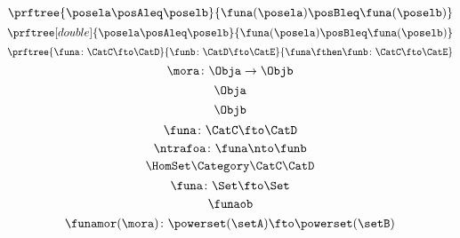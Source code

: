 {\begin{forslides}
        \begin{equation}
            \label{eq:mono2}
            \prftree{\posela \posAleq \poselb}{\funa(\posela) \posBleq \funa(\poselb)}
        \end{equation}
        \begin{equation}
            \label{eq:mono3}
            \prftree[double]{\posela \posAleq \poselb}{\funa(\posela) \posBleq \funa(\poselb)}
        \end{equation}
        \begin{equation}
            \label{eq:functor-composition1}
            \prftree{\funa\colon \CatC \fto \CatD}{\funb\colon\CatD\fto\CatE}{\funa\fthen\funb\colon \CatC \fto \CatE}
        \end{equation}
        \begin{equation}
            \label{eq:slides_mora}
            \mora\colon \Obja\to\Objb
        \end{equation}
        \begin{equation}
            \label{eq:slides_mora_obja}
            \Obja
        \end{equation}
        \begin{equation}
            \label{eq:slides_mora_objb}
            \Objb
        \end{equation}
        \begin{equation}
            \label{eq:slides_funa}
            \funa\colon\CatC\fto\CatD
        \end{equation}
        \begin{equation}
            \label{eq:slides_ntrafoa}
            \ntrafoa\colon\funa\nto\funb
        \end{equation}
        \begin{equation}
            \label{eq:slides_hom}
            \HomSet\Category\CatC\CatD
        \end{equation}
        \begin{equation}
            \label{eq:pow_fun_1}
            \funa\colon \Set \fto \Set
        \end{equation}
        \begin{equation}
            \label{eq:pow_fun_2}
            \funaob
        \end{equation}
        \begin{equation}
            \label{eq:pow_fun_3}
            \begin{aligned}
                \funamor(\mora)\colon \powerset(\setA) & \fto \powerset(\setB)                              \\

\end{aligned}
\end{equation}
\end{forslides}}
